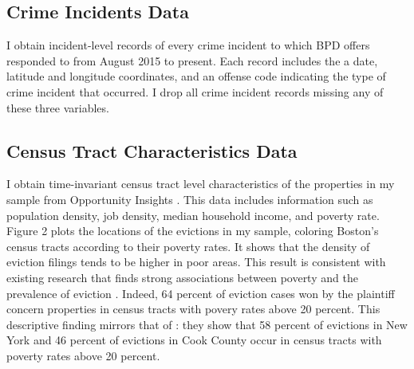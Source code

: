 \documentclass[12pt]{article}
\begin{document}
    \subsection{Crime Incidents Data}
    I obtain incident-level records of every crime incident to which BPD offers responded to from August 2015 to present. Each record includes the a date, latitude and longitude coordinates, and an offense code indicating the type of crime incident that occurred. I drop all crime incident records missing any of these three variables.  

    \subsection{Census Tract Characteristics Data}
    I obtain time-invariant census tract level characteristics of the properties in my sample from Opportunity Insights \citep{chetty_impacts_2018}. This data includes information such as population density, job density, median household income, and poverty rate. Figure 2 plots the locations of the evictions in my sample, coloring Boston's census tracts according to their poverty rates. It shows that the density of eviction filings tends to be higher in poor areas. This result is consistent with existing research that finds strong associations between poverty and the prevalence of eviction \citep{desmond_housing_2016}. Indeed, 64 percent of eviction cases won by the plaintiff concern properties in census tracts with povery rates above 20 percent. This descriptive finding mirrors that of \cite{collinson_eviction_2022}: they show that 58 percent of evictions in New York and 46 percent of evictions in Cook County occur in census tracts with poverty rates above 20 percent. 
    
\end{document}
